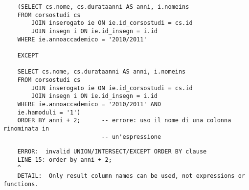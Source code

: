 \documentclass[12pt,a4paper]{book}
\begin{document}
	\begin{lstlisting}
	(SELECT cs.nome, cs.durataanni AS anni, i.nomeins
	FROM corsostudi cs
		JOIN inserogato ie ON ie.id_corsostudi = cs.id
		JOIN insegn i ON ie.id_insegn = i.id
	WHERE ie.annoaccademico = '2010/2011'
	
	EXCEPT
	
	SELECT cs.nome, cs.durataanni AS anni, i.nomeins
	FROM corsostudi cs
		JOIN inserogato ie ON ie.id_corsostudi = cs.id
		JOIN insegn i ON ie.id_insegn = i.id
	WHERE ie.annoaccademico = '2010/2011' AND 
	ie.hamoduli = '1')
	ORDER BY anni + 2;		-- errore: uso il nome di una colonna rinominata in 
							-- un'espressione
	\end{lstlisting}
	\begin{lstlisting}
	ERROR:  invalid UNION/INTERSECT/EXCEPT ORDER BY clause
	LINE 15: order by anni + 2;
	^
	DETAIL:  Only result column names can be used, not expressions or functions.
	\end{lstlisting}
\end{document}
